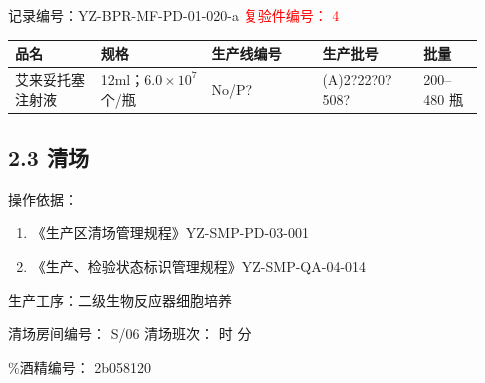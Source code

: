 \documentclass[UTF8,10pt,a4paper,fontset=fandol]{ctexart}
\newcommand{\fieldvalue}[1]{#1}
\newcommand{\handwritten}[1]{#1}
\begin{document}
\noindent
记录编号：YZ-BPR-MF-PD-01-020-a\hfill
\textcolor{red}{复验件编号：%
\fieldvalue{4}}

\begin{center}
\begin{tabular}{|p{0.17\linewidth}|p{0.22\linewidth}|p{0.22\linewidth}|p{0.20\linewidth}|p{0.12\linewidth}|}
\hline
品名 & 规格 & 生产线编号 & 生产批号 & 批量\\
\hline
\fieldvalue{艾来妥托塞注射液} &
\fieldvalue{12ml；$6.0\times10^{7}$个/瓶} &
\fieldvalue{\handwritten{No/P?}} &
\fieldvalue{\handwritten{(A)2?22?0?508?}} &
\fieldvalue{200--480 瓶}\\
\hline
\end{tabular}
\end{center}

\subsection*{2.3 清场}

\noindent
操作依据：

\begin{enumerate}
\item 《生产区清场管理规程》\hfill YZ-SMP-PD-03-001
\item 《生产、检验状态标识管理规程》\hfill YZ-SMP-QA-04-014
\end{enumerate}

\noindent
生产工序：二级生物反应器细胞培养

\noindent
清场房间编号：
\fieldvalue{\handwritten{S/06}}
\hfill
清场班次：\underline{\hspace{1cm}} 时 \underline{\hspace{1cm}} 分

\%酒精编号：
\fieldvalue{\handwritten{2b058120}}
\end{document}
